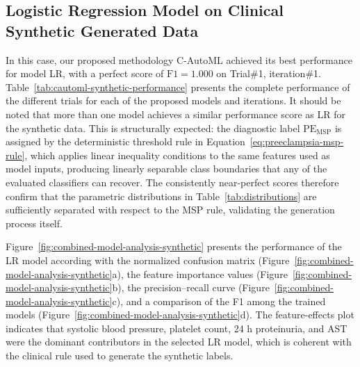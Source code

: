 \documentclass[diagnostics,article,accept,pdftex,moreauthors]{Definitions/mdpi}
\begin{document}
\subsection{Logistic Regression Model on Clinical Synthetic Generated Data}
\label{sec:synth-data-results}
In this case, our proposed methodology \ac{C-AutoML} achieved its best
performance for model \ac{LR}, with a perfect score of $\mathrm{F1}=1.000$
on Trial\#1,
iteration\#1. Table~\ref{tab:cautoml-synthetic-performance} presents
the complete performance of the different trials for each of the
proposed models and iterations. It should be noted that more than one
model achieves a similar performance score as \ac{LR} for the
synthetic data. This is structurally expected: the diagnostic
label $\mathrm{PE}_{\mathrm{MSP}}$ is assigned by the deterministic
threshold rule in Equation~\eqref{eq:preeclampsia-msp-rule}, which
applies linear inequality conditions to the same features used as model
inputs, producing linearly separable class boundaries that any of the
evaluated classifiers can recover. The consistently near-perfect
scores therefore confirm that the parametric distributions in
Table~\ref{tab:distributions} are sufficiently separated with respect to
the \ac{MSP} rule, validating the generation process itself.

Figure~\ref{fig:combined-model-analysis-synthetic} presents the
performance of the \ac{LR} model according with the normalized
confusion matrix (Figure~\ref{fig:combined-model-analysis-synthetic}a), the
feature importance values
(Figure~\ref{fig:combined-model-analysis-synthetic}b), the precision--recall
curve (Figure~\ref{fig:combined-model-analysis-synthetic}c), and a comparison
of the \ac{F1} among the trained
models (Figure~\ref{fig:combined-model-analysis-synthetic}d). The
feature-effects plot indicates that systolic blood pressure, platelet
count, 24 h proteinuria, and AST were the dominant contributors in
the selected \ac{LR} model, which is coherent with the
clinical rule used to generate the synthetic labels.
\end{document}
